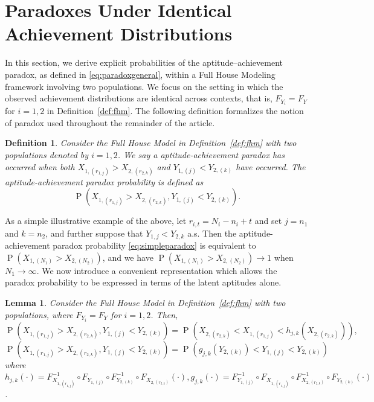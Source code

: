 \documentclass[12pt]{article}
\DeclareMathOperator*{\Prob}{P}
\newtheorem{lemma}[theorem]{Lemma}
\newtheorem{defn}[theorem]{Definition}
\begin{document}
\section{Paradoxes Under Identical Achievement Distributions}
\label{sec:samedist}


In this section, we derive explicit probabilities of the aptitude--achievement paradox, as defined in \eqref{eq:paradoxgeneral}, within a Full House Modeling framework involving two populations. We focus on the setting in which the observed achievement distributions are identical across contexts, that is, $F_{Y_i} = F_Y$ for $i = 1,2$ in Definition~\ref{def:fhm}. The following definition formalizes the notion of paradox used throughout the remainder of the article.

\begin{defn}\label{def:paradox}
Consider the Full House Model in Definition~\ref{def:fhm} with two populations denoted by $i=1,2$. We say a aptitude-achievement paradox has occurred when both $X_{1,(r_{1,j})} > X_{2,(r_{2,k})}$ and  $Y_{1,(j)} < Y_{2,(k)}$ have occurred. The aptitude-achievement paradox probability is defined as
\begin{equation} \label{eq:simpleparadox}
  \Prob\left(X_{1,(r_{1,j})} > X_{2,(r_{2,k})}, Y_{1,(j)} < Y_{2,(k)}\right).
\end{equation}	
\end{defn}

As a simple illustrative example of the above, let $r_{i,t} = N_i - n_i + t$ and set $j = n_1$ and $k = n_2$, and further suppose that $Y_{1,j} < Y_{2,k}$ a.s. Then the aptitude-achievement paradox probability \eqref{eq:simpleparadox} is equivalent to $\Prob\left(X_{1,(N_1)} > X_{2,(N_2)}\right)$, and we have $\Prob\left(X_{1,(N_1)} > X_{2,(N_2)}\right) \to 1$ when $N_1 \to \infty$. We now introduce a convenient representation which allows the paradox probability to be expressed in terms of the latent aptitudes alone.

\begin{lemma} \label{lemma:rep}
Consider the Full House Model in Definition~\ref{def:fhm} with two populations, where $F_{Y_i} = F_{Y}$ for $i=1,2$. Then, 
\begin{equation} \label{eq:pararep}
  \Prob\left(X_{1,(r_{1,j})} > X_{2,(r_{2,k})}, Y_{1,(j)} < Y_{2,(k)}\right) 
  = \Prob\left( X_{2,(r_{2,k})} < X_{1,(r_{1,j})}  < h_{j,k}\left(X_{2,(r_{2,k})}\right)\right),
\end{equation}
\begin{equation} \label{eq:pararep2}
  \Prob\left(X_{1,(r_{1,j})} > X_{2,(r_{2,k})}, Y_{1,(j)} < Y_{2,(k)}\right) 
  = \Prob\left( g_{j,k}\left(Y_{2,(k)}\right) < Y_{1,(j)}  < Y_{2,(k)}\right)
\end{equation}
where $h_{j,k}(\cdot) = F_{X_{1,(r_{1,j})}}^{-1} \circ F_{Y_{1, (j)}} \circ F_{Y_{2, (k)}}^{-1} \circ F_{X_{2,(r_{2,k})}} (\cdot), g_{j,k}(\cdot) = F_{Y_{1, (j)}}^{-1} \circ F_{X_{1,(r_{1,j})}} \circ F_{X_{2,(r_{2,k})}}^{-1} \circ F_{Y_{2, (k)}} (\cdot)$.
\end{lemma}
\end{document}
